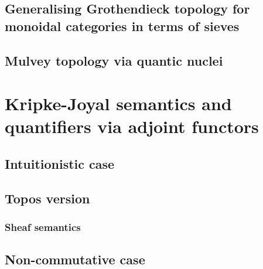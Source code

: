 \documentclass[a4paper]{article}
\theoremstyle{defin}
\theoremstyle{theorem}
\theoremstyle{claim}
\theoremstyle{prop}
\theoremstyle{lemma}
\theoremstyle{fact}
\theoremstyle{ex}
\theoremstyle{col}
\begin{document}
\subsection{Generalising Grothendieck topology for monoidal categories in terms of sieves}

\subsection{Mulvey topology via quantic nuclei}


\section{Kripke-Joyal semantics and quantifiers via adjoint functors}

\subsection{Intuitionistic case}
\subsection{Topos version}
\subsubsection{Sheaf semantics}

\subsection{Non-commutative case}



\end{document}
